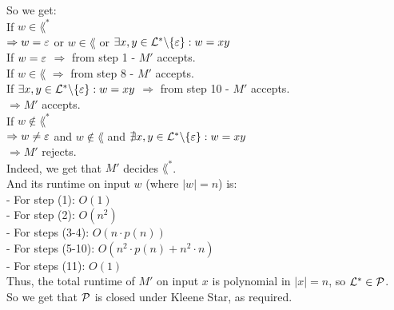 So we get: \\
If $w \in \lang^*$ \\
$\Rightarrow w = \varepsilon$ or $w \in \lang$ or $\exists x,y \in \mathcal{L}^* \backslash \{\varepsilon\}: w=xy$ \\
If $w = \varepsilon$  $\Rightarrow $ from step 1 - $M'$ accepts. \\
If $w \in \lang$  $\Rightarrow $ from step 8 - $M'$ accepts. \\
If $\exists x,y \in \mathcal{L}^* \backslash \{\varepsilon\}: w=xy$  $\Rightarrow $ from step 10 - $M'$ accepts. \\
$\Rightarrow M'$ accepts. \\

If $w \notin \lang^*$ \\
$\Rightarrow w \neq \varepsilon$ and $w \notin \lang$ and $\nexists x,y \in \mathcal{L}^* \backslash \{\varepsilon\}: w=xy$ \\
$\Rightarrow M'$ rejects. \\

Indeed, we get that $M'$ decides $\lang^*$. \\
And its runtime on input $w$ (where $|w|=n$) is: \\
- For step  (1):    $O(1)$                            \\
- For step  (2):    $O(n^2)$                          \\
- For steps (3-4):  $O(n \cdot p(n))$                 \\
- For steps (5-10): $O(n^2 \cdot p(n) + n^2 \cdot n)$ \\
- For steps (11):   $O(1)$                            \\

Thus, the total runtime of $M'$ on input $x$ is polynomial in $|x|=n$, so $\mathcal{L}^* \in \mathcal{P}$. \\
So we get that $\mathcal{P}$ is closed under Kleene Star, as required. \\

